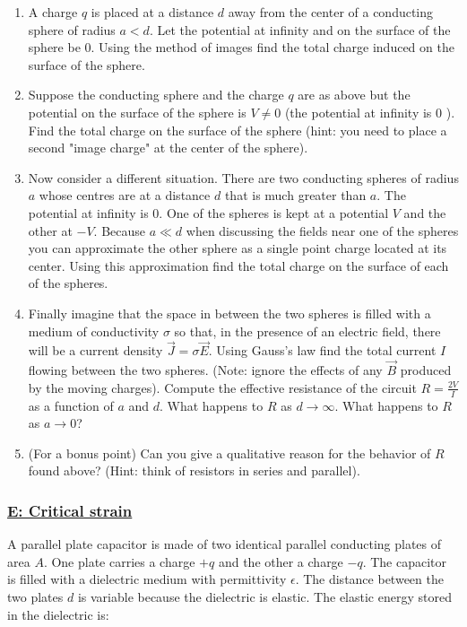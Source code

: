 \begin{enumerate}
	\item  A charge $q$ is placed at a distance $d$ away from the center of a conducting sphere of radius $a<d$. Let the potential at infinity and on the surface of the sphere be $0 .$ Using the method of images find the total charge induced on the surface of the sphere.
	\item Suppose the conducting sphere and the charge $q$ are as above but the potential on the surface of the sphere is $V \neq 0$ (the potential at infinity is 0 ). Find the total charge on the surface of the sphere (hint: you need to place a second "image charge" at the center of the sphere).
	\item Now consider a different situation. There are two conducting spheres of radius $a$ whose
	centres are at a distance $d$ that is much greater than $a .$ The potential at infinity is $0 .$ One of the spheres is kept at a potential $V$ and the other at $-V .$ Because $a \ll d$ when discussing the fields near one of the spheres you can approximate the other sphere as a single point charge located at its center. Using this approximation find the total
	charge on the surface of each of the spheres.
	\item  Finally imagine that the space in between the two spheres is filled with a medium of conductivity $\sigma$ so that, in the presence of an electric field, there will be a current density $\vec{J}=\sigma \vec{E}$. Using Gauss's law find the total current $I$ flowing between the two spheres. (Note: ignore the effects of any $\vec{B}$ produced by the moving charges). Compute the effective resistance of the circuit $R=\frac{2 V}{I}$ as a function of $a$ and $d$. What happens to $R$ as $d \rightarrow \infty$. What happens to $R$ as $a \rightarrow 0 $?
	
	\item (For a bonus point) Can you give a qualitative reason for the behavior of $R$ found
	above? (Hint: think of resistors in series and parallel).
\end{enumerate}

\subsubsection{\hyperref[E: Critical strain]{E: Critical strain}}

A parallel plate capacitor is made of two identical parallel conducting plates of area $A$.
One plate carries a charge $+q$ and the other a charge $-q .$ The capacitor is filled with a dielectric medium with permittivity $\epsilon$. The distance between the two plates $d$ is variable because the dielectric is elastic. The elastic energy stored in the dielectric is:

